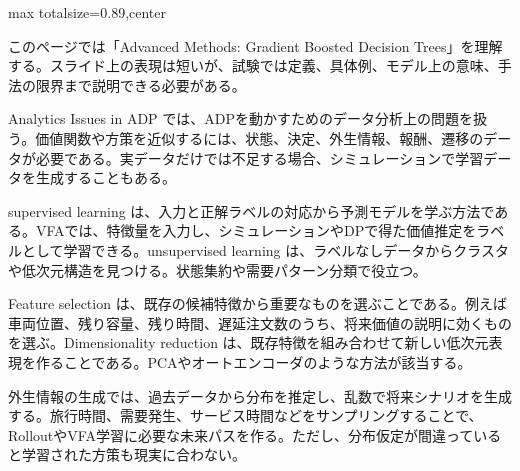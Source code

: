 \begin{minipage}[t]{0.58\textwidth}
\begin{adjustbox}{max totalsize={\textwidth}{0.89\textheight},center}
\begin{minipage}{\textwidth}\scriptsize
{}このページでは「Advanced Methods: Gradient Boosted Decision Trees」を理解する。スライド上の表現は短いが、試験では定義、具体例、モデル上の意味、手法の限界まで説明できる必要がある。\par
Analytics Issues in ADP では、ADPを動かすためのデータ分析上の問題を扱う。価値関数や方策を近似するには、状態、決定、外生情報、報酬、遷移のデータが必要である。実データだけでは不足する場合、シミュレーションで学習データを生成することもある。\par
supervised learning は、入力と正解ラベルの対応から予測モデルを学ぶ方法である。VFAでは、特徴量を入力し、シミュレーションやDPで得た価値推定をラベルとして学習できる。unsupervised learning は、ラベルなしデータからクラスタや低次元構造を見つける。状態集約や需要パターン分類で役立つ。\par
Feature selection は、既存の候補特徴から重要なものを選ぶことである。例えば車両位置、残り容量、残り時間、遅延注文数のうち、将来価値の説明に効くものを選ぶ。Dimensionality reduction は、既存特徴を組み合わせて新しい低次元表現を作ることである。PCAやオートエンコーダのような方法が該当する。\par
外生情報の生成では、過去データから分布を推定し、乱数で将来シナリオを生成する。旅行時間、需要発生、サービス時間などをサンプリングすることで、RolloutやVFA学習に必要な未来パスを作る。ただし、分布仮定が間違っていると学習された方策も現実に合わない。\par

\end{minipage}
\end{adjustbox}
\end{minipage}
